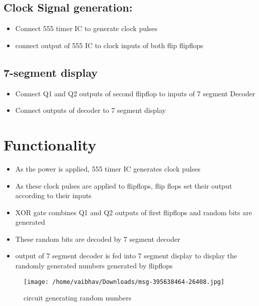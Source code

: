 \documentclass[journal,12pt,twocolumn]{IEEEtran}
\begin{document}
\subsection{Clock Signal generation:}
\begin{itemize}
    \item Connect 555 timer IC to generate clock pulses
    \item connect output of 555 IC to clock inputs of both flip flipflops
\end{itemize}

\subsection{7-segment display}
\begin{itemize}
    \item Connect Q1 and Q2 outputs of second flipflop to inputs of 7 segment Decoder
    \item Connect outputs of decoder to 7 segment display
\end{itemize}



\newpage

\section{Functionality}

\begin{itemize}
    \item As the power is applied, 555 timer IC generates clock pulses
    \item As these clock pulses are applied to flipflops, flip flops set their output according to their inputs
    \item XOR gate combines Q1 and Q2 outputs of first flipflops and random bits are generated
    \item These random bits are decoded by 7 segment decoder
    \item output of 7 segment decoder is fed into 7 segment display to display the randomly generated numbers generated by flipflops
\end{itemize}

\begin{figure}[h]
    \texttt{[image: /home/vaibhav/Downloads/msg-395638464-26408.jpg]}
    \centering
    \graphicspath{ {/home/vaibhav/Downloads/msg-395638464-26408.jpg} }
    \caption{circuit generating random numbers}
\end{figure}
\end{document}
